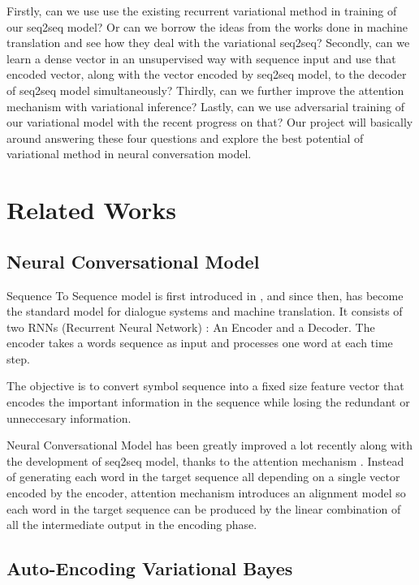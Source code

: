 \documentclass{article}
\begin{document}
 Firstly, can we use use the existing recurrent variational method \cite{vrnn} in training of our seq2seq model? Or can we borrow the ideas from the works done in machine translation \cite{vnmt} and see how they deal with the variational seq2seq? Secondly, can we learn a dense vector in an unsupervised way with sequence input \cite{vrae} and use that encoded vector, along with the vector encoded by seq2seq model, to the decoder of seq2seq model simultaneously? Thirdly, can we further improve the attention mechanism with variational inference? Lastly, can we use adversarial training of our variational model with the recent progress on that? Our project will basically around answering these four questions and explore the best potential of variational method in neural conversation model.

\section{Related Works}

\subsection{Neural Conversational Model}

Sequence To Sequence model is first introduced in \cite{seq2seq}, and since then, has become the standard model for dialogue systems \cite{ncm} and machine translation. It consists of two RNNs (Recurrent Neural Network) : An Encoder and a Decoder. The encoder takes a words sequence as input and processes one word at each time step. 

The objective is to convert symbol sequence into a fixed size feature vector that encodes the important information in the sequence while losing the redundant or unneccesary information.

Neural Conversational Model has been greatly improved a lot recently along with the development of seq2seq model, thanks to the attention mechanism \cite{attention}. Instead of generating each word in the target sequence all depending on a single vector encoded by the encoder, attention mechanism introduces an alignment model so each word in the target sequence can be produced by the linear combination of all the intermediate output in the encoding phase. 

\subsection{Auto-Encoding Variational Bayes}
\end{document}
